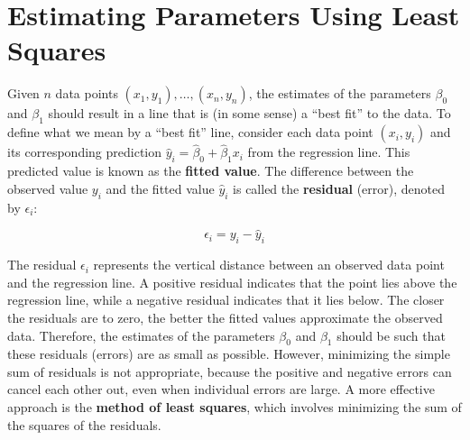 \documentclass[twoside]{book}
\begin{document}


\section{Estimating Parameters Using Least Squares}

Given \( n \) data points \( (x_1, y_1), \ldots, (x_n, y_n) \), the estimates of the parameters \( \beta_0 \) and \( \beta_1 \) should result in a line that is (in some sense) a ``best ﬁt'' to the data. To define what we mean by a ``best fit'' line, consider each data point \( (x_i, y_i) \) and its corresponding prediction \( \hat{y}_i = \hat{\beta}_0 + \hat{\beta}_1 x_i \) from the regression line. This predicted value is known as the \textbf{fitted value}. The difference between the observed value \( y_i \) and the fitted value \( \hat{y}_i \) is called the \textbf{residual} (error), denoted by \( \epsilon_i \):

\begin{textbox}
    \[
\epsilon_i = y_i - \hat{y}_i
\]
\end{textbox}

The residual \( \epsilon_i \) represents the vertical distance between an observed data point and the regression line. A positive residual indicates that the point lies above the regression line, while a negative residual indicates that it lies below. The closer the residuals are to zero, the better the fitted values approximate the observed data. Therefore, the estimates of the parameters \( \beta_0 \) and \( \beta_1 \) should be such that these residuals (errors) are as small as possible. However, minimizing the simple sum of residuals is not appropriate, because the positive and negative errors can cancel each other out, even when individual errors are large. A more effective approach is the \textbf{method of least squares}, which involves minimizing the sum of the squares of the residuals.
\end{document}
